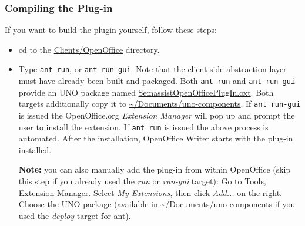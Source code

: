 \subsubsection{Compiling the Plug-in}
If you want to build the plugin yourself, follow these steps:
\begin{itemize}
  \item cd to the \url{Clients/OpenOffice} directory.

  \item Type \texttt{ant run}, or \texttt{ant run-gui}. Note that the
    client-side abstraction layer must have already been built and
    packaged. Both \texttt{ant run} and \texttt{ant run-gui} provide
    an UNO package named \url{SemassistOpenOfficePlugIn.oxt}. Both
    targets additionally copy it to \url{~/Documents/uno-components}.
    If \texttt{ant run-gui} is issued the OpenOffice.org
    \emph{Extension Manager} will pop up and prompt the user to
    install the extension.  If \texttt{ant run} is issued the above
    process is automated.  After the installation, OpenOffice Writer
    starts with the plug-in installed.

    \textbf{Note:} you can also manually add the plug-in from within
    OpenOffice (skip this step if you already used the \emph{run} or
    \emph{run-gui} target): Go to Tools, Extension Manager. Select
    \emph{My Extensions}, then click \emph{Add...} on the
    right. Choose the UNO package (available in
    \url{~/Documents/uno-components} if you used the \emph{deploy}
    target for ant).
\end{itemize}

